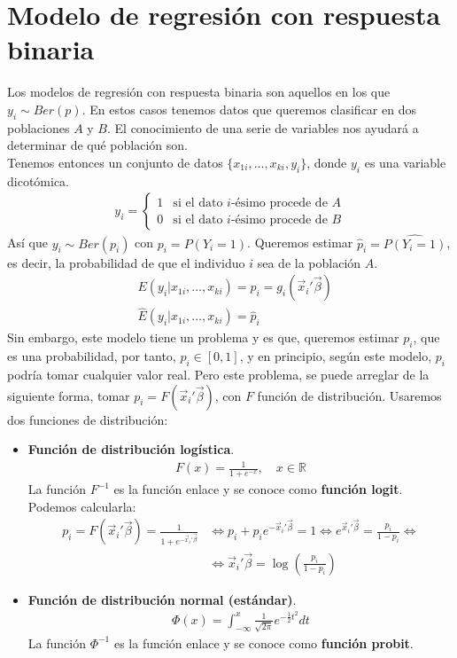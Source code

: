 \section{Modelo de regresión con respuesta binaria}
\noindent Los modelos de regresión con respuesta binaria son aquellos en los que $y_i \sim Ber(p)$. En estos casos tenemos datos que queremos clasificar en dos poblaciones $A$ y $B$. El conocimiento de una serie de variables nos ayudará a determinar de qué población son.
\\
\newline
Tenemos entonces un conjunto de datos $\{x_{1i}, \dots, x_{ki}, y_i\}$, donde $y_i$ es una variable dicotómica.
\begin{align*}
    y_i = \begin{cases}
        1 & \text{si el dato $i$-ésimo procede de $A$} \\
        0 & \text{si el dato $i$-ésimo procede de $B$} 
    \end{cases}
\end{align*}
Así que $y_i \sim Ber(p_i)$ con $p_i = P(Y_i = 1)$. Queremos estimar $\widehat{p}_i = \widehat{P(Y_i = 1)}$, es decir, la probabilidad de que el individuo $i$ sea de la población $A$.
\begin{align*}
     & E(y_i | x_{1i}, \dots, x_{ki}) = p_i = g_i(\vec{x}_i'\vec{\beta}) \\
     & \widehat{E}(y_i | x_{1i}, \dots, x_{ki}) = \widehat{p}_i
\end{align*}
Sin embargo, este modelo tiene un problema y es que, queremos estimar $p_i$, que es una probabilidad, por tanto, $p_i \in [0,1]$, y en principio, según este modelo, $p_i$ podría tomar cualquier valor real. Pero este problema, se puede arreglar de la siguiente forma, tomar $p_i = F(\vec{x}_i'\vec{\beta})$, con $F$ función de distribución. Usaremos dos funciones de distribución:
\begin{itemize}
    \item \textbf{Función de distribución logística}.
        \begin{align*}
              F(x) = \frac{1}{1 + e^{-x}}, \quad x \in \mathbb{R}
        \end{align*}
        La función $F^{-1}$ es la función enlace y se conoce como \textbf{función logit}.
          Podemos calcularla:
        \begin{align*}
               p_i = F(\vec{x}_i'\vec{\beta}) = \frac{1}{1 + e^{-\vec{x}_i'\vec{\beta}}} &\Longleftrightarrow p_i + p_ie^{-\vec{x}_i'\vec{\beta}} = 1 \Longleftrightarrow e^{\vec{x}_i'\vec{\beta}} = \frac{p_i}{1 - p_i} \Leftrightarrow \\
               & \Longleftrightarrow \vec{x}_i'\vec{\beta} = \log\left(\frac{p_i}{1-p_i}\right)
          \end{align*}
    \item \textbf{Función de distribución normal (estándar)}.
          \begin{align*}
              \Phi(x) = \int_{-\infty}^x \frac{1}{\sqrt{2\pi}} e^{-\frac{1}{2}t^2} dt
          \end{align*}
          La función $\Phi^{-1}$ es la función enlace y se conoce como \textbf{función probit}.
\end{itemize} 

